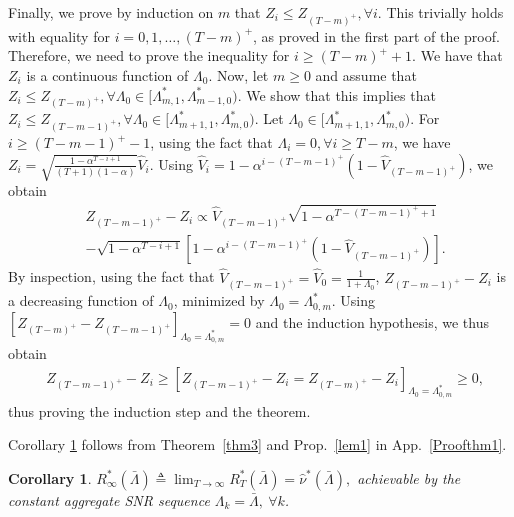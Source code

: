 \documentclass[10pt,twocolumn,twoside]{IEEEtran}
\newtheorem{corol}{Corollary}
\theoremstyle{plain}
\begin{document}
Finally, we prove by induction on $m$ that
$Z_{i}{\leq}Z_{(T-m)^+},\forall i$. 
 This trivially holds with equality for $i=0,1,\dots, (T-m)^+$, as proved in the first part of the proof.
Therefore, we need to prove the inequality for $i\geq (T-m)^++1$.
We have that $Z_i$ is a continuous function of $\Lambda_0$.
Now, let $m\geq 0$ and assume that $Z_{i}\leq Z_{(T-m)^+},\forall \Lambda_0\in[\Lambda_{m,1}^*,\Lambda_{m-1,0}^*)$.
We show that this implies that $Z_{i}\leq Z_{(T-m-1)^+},\forall \Lambda_0\in[\Lambda_{m+1,1}^*,\Lambda_{m,0}^*)$.
Let $\Lambda_0\in[\Lambda_{m+1,1}^*,\Lambda_{m,0}^*)$. 
For $i\geq (T-m-1)^+-1$, using the fact that $\Lambda_i=0,\forall i\geq T-m$, we have
$
Z_i\!=\!\sqrt{\frac{1-\alpha^{T-i+1}}{(T+1)(1-\alpha)}}\hat V_i.
$
Using $\hat V_i=1-\alpha^{i-(T-m-1)^+}(1-\hat V_{(T-m-1)^+})$, we obtain
 \begin{align*}
&Z_{(T-m-1)^+}-Z_{i}
\!\propto\!\hat V_{(T-m-1)^+}\sqrt{1-\alpha^{T-(T-m-1)^++1}}
\nonumber\\&
-\sqrt{1-\alpha^{T-i+1}}
[1-\alpha^{i-(T-m-1)^+}(1-\hat V_{(T-m-1)^+})].
\end{align*}
By inspection, using the fact that $\hat V_{(T-m-1)^+}=\hat V_0=\frac{1}{1+\Lambda_0}$,  $Z_{(T-m-1)^+}-Z_{i}$
 is a decreasing function of $\Lambda_0$, minimized by $\Lambda_0=\Lambda_{0,m}^*$.  
 Using $\left[Z_{(T-m)^+}\!-\!Z_{(T-m-1)^+}\right]_{\Lambda_0=\Lambda_{0,m}^*}\!\!\!\!\!\!\!\!\!\!\!\!\!=0$
 and the induction hypothesis, 
 we thus obtain
 \begin{align}
&Z_{(T-m-1)^+}\!\!\!-Z_{i}
\!\geq\!
\left[Z_{(T-m-1)^+}\!\!\!-\!Z_{i}
\!=\!
Z_{(T-m)^+}\!\!\!-\!Z_{i}\right]_{\Lambda_0=\Lambda_{0,m}^*}\!\!\!\!\!\!\!\geq 0,
\nonumber
\end{align}
thus proving the induction step and the theorem.
\hfill\QED

\noindent Corollary \ref{corollary} follows from Theorem~\ref{thm3} and Prop.~\ref{lem1} in App.~\ref{Proofthm1}.
\vspace{-3mm}
\begin{corol}
\label{corollary}
$R_\infty^*(\bar\Lambda)
\triangleq\lim_{T\to\infty}R_T^*(\bar\Lambda)=\hat \nu^*\left(\bar\Lambda\right),
$
achievable by the constant aggregate SNR sequence $\Lambda_k=\bar\Lambda,\ \forall k$.
\end{corol}
\vspace{-5mm}
 
\end{document}
